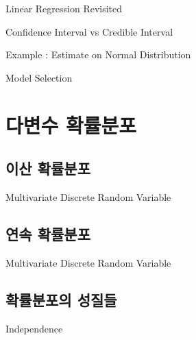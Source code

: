 \documentclass{beamer}
\begin{document}

\begin{frame}{Linear Regression Revisited} 

\end{frame}

\begin{frame}[allowframebreaks]{Confidence Interval vs Credible Interval}

\end{frame}


\begin{frame}[allowframebreaks]{Example : Estimate on Normal Distribution}

\end{frame}

\begin{frame}[allowframebreaks]{Model Selection}

\end{frame}

\section{다변수 확률분포}

\subsection{이산 확률분포} 

\begin{frame}[allowframebreaks]{Multivariate Discrete Random Variable}

\end{frame}


\subsection{연속 확률분포} 

\begin{frame}[allowframebreaks]{Multivariate Discrete Random Variable}

\end{frame}


\subsection{확률분포의 성질들}

\begin{frame}{Independence}    

\end{frame}
\end{document}
